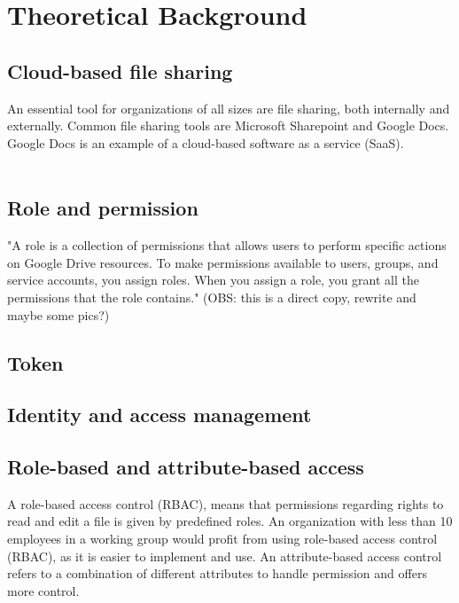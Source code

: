 \documentclass[12pt,a4paper]{article}
\begin{document}
\clearpage

\section{Theoretical Background}
\label{theoretical_Background}
\subsection{Cloud-based file sharing}
An essential tool for organizations of all sizes are file sharing, both internally and externally. Common file sharing tools are Microsoft Sharepoint and Google Docs. Google Docs is an example of a cloud-based software as a service (SaaS). \cite{IT_Sikkerhed_i_praksis}\\ \\

\subsection{Role and permission}
"A role is a collection of permissions that allows users to perform specific actions on Google Drive resources. To make permissions available to users, groups, and service accounts, you assign roles. When you assign a role, you grant all the permissions that the role contains."\cite{Microsoft_roles} (OBS: this is a direct copy, rewrite and maybe some pics?)

\subsection{Token}

\subsection{Identity and access management}


\subsection{Role-based and attribute-based access}
A role-based access control (RBAC), means that permissions regarding rights to read and edit a file is given by predefined roles.\cite{RBAC_vs._ABAC}
An organization with less than 10 employees in a working group would profit from using role-based access control (RBAC), as it is easier to implement and use.\cite{RBAC_vs._ABAC} 
An attribute-based access control refers to a combination of different attributes to handle permission and offers more control.\cite{RBAC_vs._ABAC}
\end{document}
